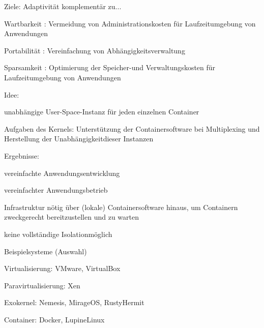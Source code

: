 \documentclass[a4paper]{article}
\newcommand{\cmark}{\ding{51}}
\newcommand{\xmark}{\ding{55}}
\begin{document}
\begin{multicols}{3}
    \begin{itemize*}
        \item
        Ziele: Adaptivität komplementär zu...
        \begin{itemize*}
            \item Wartbarkeit : Vermeidung von Administrationskosten für Laufzeitumgebung von Anwendungen
            \item Portabilität : Vereinfachung von Abhängigkeitsverwaltung
            \item Sparsamkeit : Optimierung der Speicher-und Verwaltungskosten für Laufzeitumgebung von Anwendungen
        \end{itemize*}
        \item
        Idee:
        \begin{itemize*}
            \item unabhängige User-Space-Instanz für jeden einzelnen Container
            \item Aufgaben des Kernels: Unterstützung der Containersoftware bei Multiplexing und Herstellung der Unabhängigkeitdieser Instanzen
        \end{itemize*}
        \item
        Ergebnisse:
        \begin{itemize*}
            \item \cmark  vereinfachte Anwendungsentwicklung
            \item \cmark  vereinfachter Anwendungsbetrieb
            \item \xmark  Infrastruktur nötig über (lokale) Containersoftware hinaus, um Containern zweckgerecht bereitzustellen und zu warten
            \item \xmark  keine vollständige Isolationmöglich
        \end{itemize*}
    \end{itemize*}

    Beispielsysteme (Auswahl)

    \begin{itemize*}
        \item
        Virtualisierung: VMware, VirtualBox
        \item
        Paravirtualisierung: Xen
        \item
        Exokernel: Nemesis, MirageOS, RustyHermit
        \item
        Container: Docker, LupineLinux
    \end{itemize*}



\end{multicols}
\end{document}
